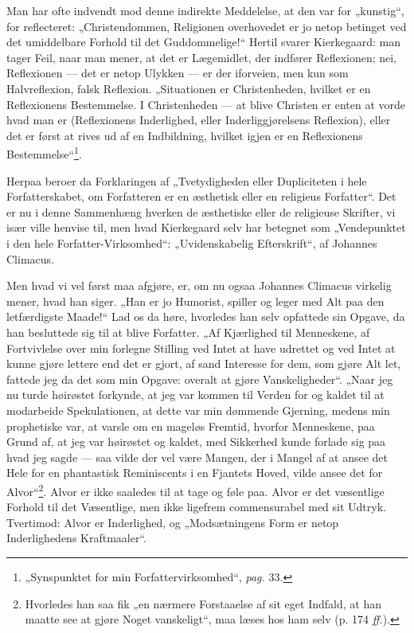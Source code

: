 \documentclass[12pt,a4paper]{book}
\newcommand{\opage}[1]{\marginnote{\footnotesize\textit{[#1]}}}
\begin{document}
Man har ofte indvendt mod denne indirekte Meddelelse, at den var for
„kunstig“, for reflecteret: „Christendommen, Religionen overhovedet er jo
netop betinget ved det umiddelbare Forhold til det Guddommelige!“ Hertil
svarer Kierkegaard: man tager Feil, naar man mener, at det er Lægemidlet,
der indfører Reflexionen; nei, Reflexionen --- det er netop Ulykken --- er
der iforveien, men kun som Halvreflexion,
\opage{20}\setcounter{footnote}{0}%
falsk Reflexion. „Situationen er Christenheden, hvilket er en Reflexionens
Bestemmelse. I Christenheden --- at blive Christen er enten at vorde hvad
man er (Reflexionens Inderlighed, eller Inderliggjørelsens Reflexion), eller
det er først at rives ud af en Indbildning, hvilket igjen er en Reflexionens
Bestemmelse“\footnote{„Synspunktet for min Forfattervirksomhed“,
\textit{pag.} 33.}.

Herpaa beroer da Forklaringen af „Tvetydigheden eller Dupliciteten i hele
Forfatterskabet, om Forfatteren er en æsthetisk eller en religieus
Forfatter“. Det er nu i denne Sammenhæng hverken de æsthetiske eller de
religieuse Skrifter, vi især ville henvise til, men hvad Kierkegaard selv
har betegnet som „Vendepunktet i den hele Forfatter-Virksomhed“:
„Uvidenskabelig Efterskrift“, af Johannes Climacus.

Men hvad vi vel først maa afgjøre, er, om nu ogsaa Johannes Climacus
virkelig mener, hvad han siger. „Han er jo Humorist, spiller og leger med
Alt paa den letfærdigste Maade!“ Lad os da høre, hvorledes han selv
opfattede sin Opgave, da han besluttede sig til at blive Forfatter. „Af
Kjærlighed til Menneskene, af Fortvivlelse over min forlegne Stilling ved
Intet at have udrettet og ved Intet at kunne gjøre lettere end det er gjort,
af sand Interesse for dem, som gjøre Alt let, fattede jeg da det som min
Opgave: overalt at gjøre Vanskeligheder“. „Naar jeg nu turde høirøstet
forkynde, at jeg var kommen til Verden for og kaldet til at modarbeide
Spekulationen, at dette var min dømmende Gjerning, medens min prophetiske
var, at varsle om en mageløs Fremtid, hvorfor Menneskene, paa Grund af, at
jeg var høirøstet og kaldet, med Sikkerhed kunde forlade sig paa hvad jeg
sagde --- saa vilde der vel være Mangen, der i Mangel af at ansee det Hele
for en phantastisk Reminiscents i en Fjantets Hoved, vilde ansee det for
Alvor“\footnote{Hvorledes han saa fik „en nærmere Forstaaelse af sit eget
Indfald, at han maatte see at gjøre Noget vanskeligt“, maa læses hos ham
selv (p. 174 \textit{ff.}).}. Alvor er ikke
\opage{21}\setcounter{footnote}{0}%
saaledes til at tage og føle paa. Alvor er det væsentlige Forhold til det Væsentlige, men ikke ligefrem commensurabel med sit Udtryk. Tvertimod: Alvor er Inderlighed, og „Modsætningens Form er netop Inderlighedens Kraftmaaler“.
\end{document}
